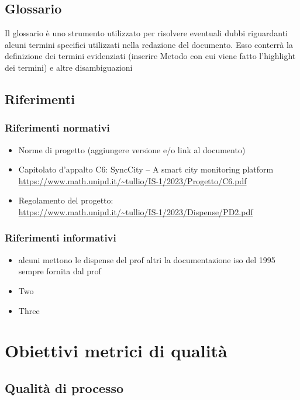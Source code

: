 \documentclass[italian,12pt]{article} %
\begin{document}
\subsection{Glossario}
Il glossario è uno strumento utilizzato per risolvere eventuali dubbi riguardanti 
alcuni termini specifici utilizzati nella redazione del documento.
Esso conterrà la definizione dei termini evidenziati (inserire Metodo con cui viene fatto l'highlight dei termini)
e altre disambiguazioni 
\subsection{Riferimenti}

\subsubsection{Riferimenti normativi}
\begin{itemize}
    \item Norme di progetto (aggiungere versione e/o link al documento)
    \item Capitolato d'appalto C6: SyncCity – A smart city monitoring platform\\
		  \url{https://www.math.unipd.it/~tullio/IS-1/2023/Progetto/C6.pdf}
    \item Regolamento del progetto:\\
		  \url{https://www.math.unipd.it/~tullio/IS-1/2023/Dispense/PD2.pdf}
\end{itemize}

\subsubsection{Riferimenti informativi}
\begin{itemize}
    \item alcuni mettono le dispense del prof altri la documentazione iso del 1995 
			sempre fornita dal prof
    \item Two
    \item Three
\end{itemize}

\section{Obiettivi metrici di qualità}

\subsection{Qualità di processo}
\end{document}

